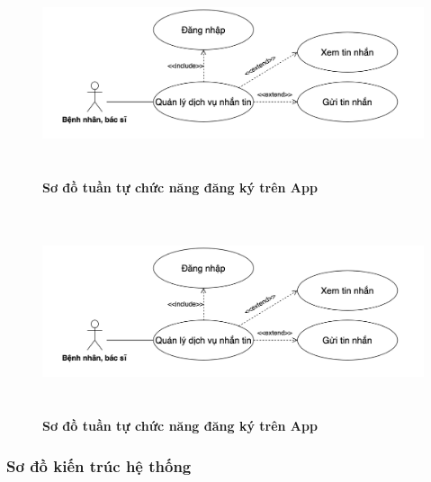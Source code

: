\documentclass{article}%
\begin{document}
  \begin{figure}[H]
    \centering
    \includegraphics[width=15cm,height=6cm]{Images/mobile_app/use_case_send_receive_message.png}
    \caption[Sơ đồ tuần tự chức năng đăng ký trên App]{\bfseries \fontsize{12pt}{0pt}
    \selectfont Sơ đồ tuần tự chức năng đăng ký trên App}
    \label{hinh21} %
  \end{figure}

  \begin{figure}[H]
    \centering
    \includegraphics[width=15cm,height=6cm]{Images/mobile_app/use_case_send_receive_message.png}
    \caption[Sơ đồ tuần tự chức năng đăng ký trên App]{\bfseries \fontsize{12pt}{0pt}
    \selectfont Sơ đồ tuần tự chức năng đăng ký trên App}
    \label{hinh21} %
  \end{figure}


\subsubsection{Sơ đồ kiến trúc hệ thống}
\end{document}
